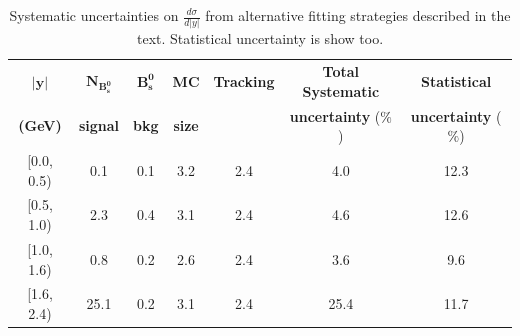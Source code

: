 \begin{table}[htbp] \begin{center}\begin{tabular}{|c|c|c|c|c|c|c|}\hline$\mathbf{|y|}$    &  $\mathbf{N_{B_s^{0}}} $    &  $\mathbf{B_s^{0}} $  & \textbf{MC}   & \textbf{Tracking}  & \textbf{Total Systematic}  & \textbf{Statistical} \\\textbf{(GeV)}   & \textbf{signal}   & \textbf{bkg}    & \textbf{size} &           & \textbf{uncertainty} ($\mathbf{\%}$) & \textbf{uncertainty} ($\mathbf{\%}$) \\\hline{[}0.0, 0.5{)}  &  0.1  &  0.1 &  3.2  &  2.4 &  4.0 &  12.3 \\{[}0.5, 1.0{)}  &  2.3  &  0.4 &  3.1  &  2.4 &  4.6 &  12.6 \\{[}1.0, 1.6{)}  &  0.8  &  0.2 &  2.6  &  2.4 &  3.6 &  9.6 \\{[}1.6, 2.4{)}  &  25.1  &  0.2 &  3.1  &  2.4 &  25.4 &  11.7 \\\hline\end{tabular}\caption{Systematic uncertainties on  ${\frac{d \sigma}{d|y|}}$ from alternative fitting strategies described in the text. Statistical uncertainty is show too.}\label{table:Systematics_y}\end{center}\end{table}